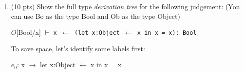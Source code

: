 \documentclass[10pt]{article}
\newcommand{\infertext}[2]{\infer{{\textrm{#2}}}{\begin{aligned}#1\end{aligned}}}
\begin{document}
\begin{enumerate}
\begin{enumerate}
	\item\begin{equation} \infertext{
		& \textrm{$O, M, C \vdash$ x: SELF\_TYPE} 	\\
		& \textrm{$O, M, C \vdash$ self: SELF\_TYPE} \\
		& \textrm{SELF\_TYPE $=$ SLEF\_TYPE}
	} {
		$O, M, C \vdash$ x = self: Bool
	}\end{equation}


	\item Error, as var $i$ has type Int while var $x$ has type SELF\_TYPE


	\item \begin{equation} \infertext {
		& \textrm{$T_0' = $ B} \\
		& \textrm{$O$[SELF\_TYPE/x], $M, C \vdash$ x: $SELF\_TYPE_B$} \\
		& \textrm{B $\leq$ B $\Rightarrow$ $SELF\_TYPE_B \leq$ B} \\
		& \textrm{$O$[$T_0'$/x], $M, C \vdash$ x: B}
	} {
		$O, M, C \vdash$ let x: B $\leftarrow$ x in x: B
	} \end{equation}


	\item\begin{equation} \infertext{
		& \textrm{$O, M, C \vdash $ o : Object} \\
		& \textrm{$O$ [Int/o], $M, C \vdash $ b : B} \\
		& \textrm{$O$ [Bool/o], $M, C \vdash $ o: Object} \\
		& \textrm{$O$ [Object/o], $M, C \vdash $ true: Bool} \\
	} {
		$O, M, C \vdash$ case o of ... esac: Object
	}\end{equation}
\end{enumerate}

\medskip

\item (10 pts) Show the full type \emph{derivation tree }for the following judgement:
(You can use Bo as the type Bool and Ob as the type Object)

\begin{center}
$O$[Bool/x] $\vdash$ \tt{x $\leftarrow$ (let x:Object $\leftarrow$ x in x = x): Bool}
\end{center}
To save space, let's identify some labels first:
\begin{center}
	$e_0$: \textrm{x $\rightarrow$ let x:Object $\leftarrow$ x in x = x}
\end{center}



\end{enumerate}
\end{document}
